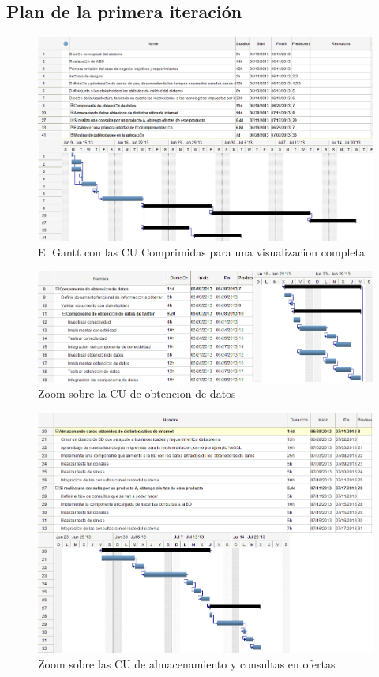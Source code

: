 \begin{landscape}

\subsection{Plan de la primera iteración}

\begin{figure}[H]
\centering
\includegraphics[scale=\escaladefault]{graficos/gantt/gantt.png}
\caption{El Gantt con las CU Comprimidas para una visualizacion completa}
\end{figure}

\begin{figure}[H]
\centering
\includegraphics[scale=\escaladefault]{graficos/gantt/subgantt1.png}
\caption{Zoom sobre la CU de obtencion de datos}
\end{figure}

\begin{figure}[H]
\centering
\includegraphics[scale=\escaladefault]{graficos/gantt/subgantt2.png}
\caption{Zoom sobre las CU de almacenamiento y consultas en ofertas}
\end{figure}


\end{landscape}
